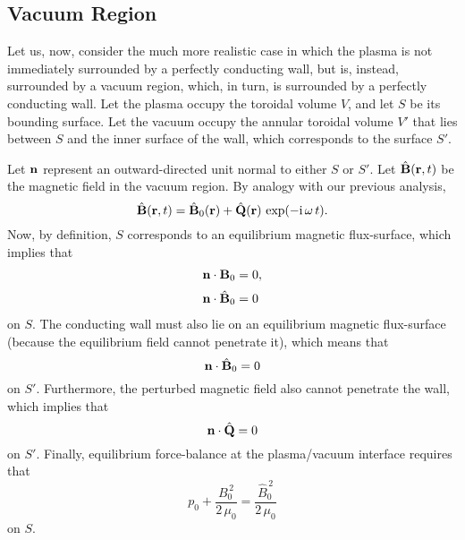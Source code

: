 \documentclass[12pt,prb,aps,notitlepage]{revtex4-1}
\begin{document}
\subsection{Vacuum Region}
Let us, now,  consider the much more realistic case in which the plasma is not immediately surrounded by a perfectly
conducting wall, but is, instead, surrounded by a vacuum region, which, in turn, is surrounded by
a perfectly conducting wall. Let the plasma occupy the toroidal volume $V$, and let $S$ be its bounding surface. Let the vacuum occupy the annular
toroidal volume $V'$
that lies between $S$ and the inner surface of the wall, which corresponds to the surface $S'$. 

Let ${\bf n}$ represent an outward-directed unit normal
to either $S$ or $S'$. 
Let $\hat{\bf B}({\bf r},t)$ be the magnetic field in the vacuum region. By analogy with our previous analysis, 
\begin{equation}
\hat{\bf B}({\bf r},t)= \hat{\bf B}_0({\bf r}) + \hat{\bf Q}({\bf r})\,\exp(-{\rm i}\,\omega\,t).
\end{equation}
 Now, by definition, $S$ corresponds to an equilibrium magnetic flux-surface,
which implies that
\begin{align}\label{e166}
{\bf n}\cdot{\bf B}_0 &=0,\\[0.5ex]
{\bf n}\cdot\hat{\bf B}_0 &=0\label{e166a}
\end{align}
on $S$. The conducting wall must also lie on an equilibrium magnetic flux-surface (because the equilibrium field cannot
penetrate it), which means that
\begin{equation}\label{e167}
{\bf n}\cdot\hat{\bf B}_0 =0
\end{equation}
on $S'$. Furthermore, the perturbed magnetic field also cannot penetrate the wall, which implies that
\begin{equation}
{\bf n}\cdot\hat{\bf Q}=0
\end{equation}
on $S'$.  Finally, equilibrium force-balance at the plasma/vacuum interface requires that
\begin{equation}\label{e171v}
p_0 + \frac{B_0^{\,2}}{2\,\mu_0} = \frac{\hat{B}_0^{\,2}}{2\,\mu_0}
\end{equation}
on $S$. 
\end{document}
